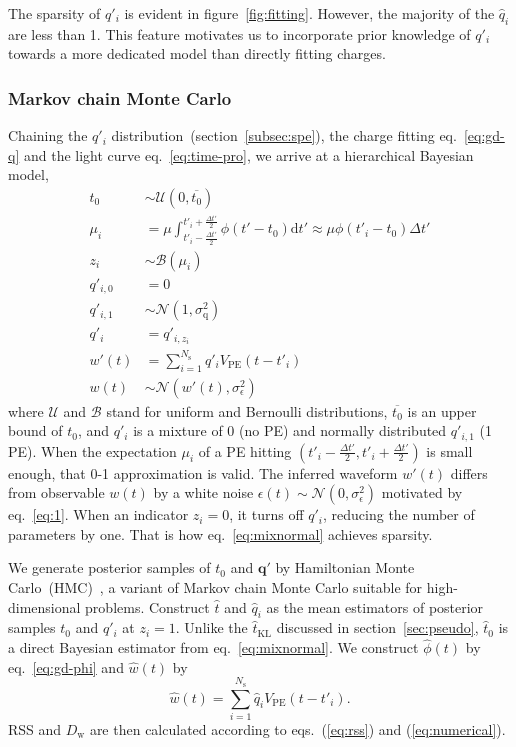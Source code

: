 The sparsity of $q'_i$ is evident in figure~\ref{fig:fitting}.  However, the majority of the $\hat{q}_i$ are less than 1.  This feature motivates us to incorporate prior knowledge of $q'_i$ towards a more dedicated model than directly fitting charges.


\subsubsection{Markov chain Monte Carlo}
\label{subsec:mcmc}
Chaining the $q'_i$ distribution~(section~\ref{subsec:spe}), the charge fitting eq.~\eqref{eq:gd-q} and the light curve eq.~\eqref{eq:time-pro}, we arrive at a hierarchical Bayesian model,
\begin{equation}
  \begin{aligned}
    t_{0} &\sim \mathcal{U}(0, \overline{t_0}) \\
    \mu_i &= \mu \int_{t'_i-\frac{\Delta t'}{2}}^{t'_i+\frac{\Delta t'}{2}} \phi(t' - t_0)\mathrm{d}t' \approx \mu\phi(t'_i - t_0)\Delta{t'} \\
    z_i &\sim \mathcal{B}(\mu_i) \\
    q'_{i,0}&=0\\
    q'_{i,1}& \sim \mathcal{N}(1, \sigma_\mathrm{q}^2)\\
    q'_i &= q'_{i,z_i}\\
    w'(t) & = \sum_{i=1}^{N_\mathrm{s}}q'_iV_\mathrm{PE}(t-t'_i)\\
    w(t) &\sim \mathcal{N}(w'(t), \sigma_\epsilon^2)
  \end{aligned}
  \label{eq:mixnormal}
\end{equation}
where $\mathcal{U}$ and $\mathcal{B}$ stand for uniform and Bernoulli distributions, $\overline{t_0}$ is an upper bound of $t_0$, and $q'_i$ is a mixture of 0 (no PE) and normally distributed $q'_{i,1}$ (1 PE). When the expectation $\mu_i$ of a PE hitting $(t'_{i} - \frac{\Delta t'}{2}, t'_{i} + \frac{\Delta t'}{2})$ is small enough, that 0-1 approximation is valid.  The inferred waveform $w'(t)$ differs from observable $w(t)$ by a white noise $\epsilon(t) \sim \mathcal{N}(0, \sigma_\epsilon^2)$ motivated by eq.~\eqref{eq:1}.  When an indicator $z_i=0$, it turns off $q'_i$, reducing the number of parameters by one.  That is how eq.~\eqref{eq:mixnormal} achieves sparsity.

We generate posterior samples of $t_0$ and $\bm{q'}$ by Hamiltonian Monte Carlo~(HMC)~\cite{neal_mcmc_2012}, a variant of Markov chain Monte Carlo suitable for high-dimensional problems. Construct $\hat{t}$ and $\hat{q}_i$ as the mean estimators of posterior samples $t_0$ and $q'_i$ at $z_i=1$.  Unlike the $\hat{t}_\mathrm{KL}$ discussed in section~\ref{sec:pseudo}, $\hat{t}_0$ is a direct Bayesian estimator from eq.~\eqref{eq:mixnormal}.  We construct $\hat{\phi}(t)$ by eq.~\eqref{eq:gd-phi} and $\hat{w}(t)$ by
\begin{equation}
  \label{eq:mcmc-w}
  \hat{w}(t) = \sum_{i=1}^{N_\mathrm{s}}\hat{q}_iV_\mathrm{PE}(t-t'_i).
\end{equation}
RSS and $D_\mathrm{w}$ are then calculated according to eqs.~(\ref{eq:rss}) and (\ref{eq:numerical}).

